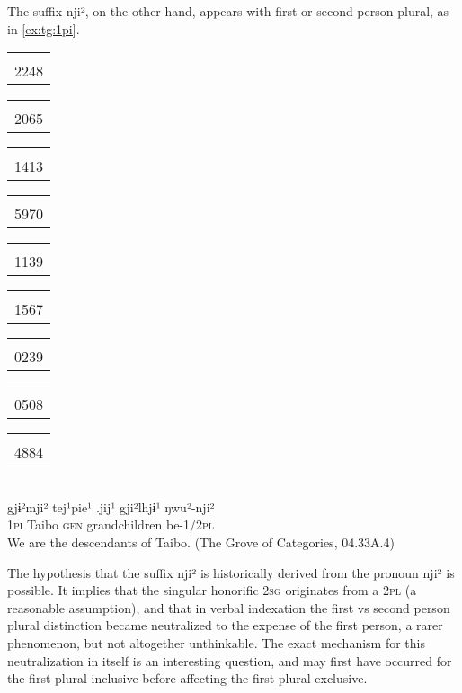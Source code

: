 \documentclass[oldfontcommands,oneside,a4paper,11pt]{article}
\newcommand{\ipa}[1]{{\phon \mbox{#1}}} %
\newcommand{\tgf}[1]{\begin{tabular}{l}\mo{#1}\\{\tiny #1}\end{tabular}}
\begin{document}
The suffix  \ipa{nji²}, on the other hand, appears with first or second person plural, as in \ref{ex:tg:1pi}.

\begin{exe}
\ex \label{ex:tg:1pi}  
\glll 
\tgf{2248}\tgf{2065} 	\tgf{1413}\tgf{5970} 	\tgf{1139} 	\tgf{1567}\tgf{0239} 	\tgf{0508}\tgf{4884} \\
\ipa{gjɨ²mji²} 	\ipa{tej¹pie¹} 	\ipa{.jij¹} 	\ipa{gji²lhjɨ¹} 	\ipa{ŋwu²-nji²} \\
\textsc{1pi} Taibo \textsc{gen} grandchildren be-\textsc{1/2pl} \\
\glt We are the descendants of Taibo. (The Grove of Categories, 04.33A.4)
\end{exe}

The hypothesis that the suffix  \ipa{nji²} is historically derived from the pronoun  \ipa{nji²} is possible. It implies that the singular honorific \textsc{2sg} originates from a \textsc{2pl} (a reasonable assumption), and that in verbal indexation the first vs second person plural distinction became neutralized to the expense of the first person, a rarer phenomenon, but not altogether unthinkable. The exact mechanism for this neutralization in itself is an interesting question, and may first have occurred for the first plural inclusive before affecting the first plural exclusive.

\end{document}
